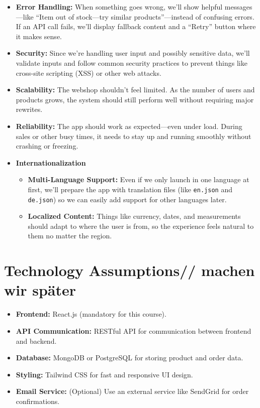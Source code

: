\documentclass[a4paper,12pt]{article}
\begin{document}
\begin{itemize}
    \item \textbf{Error Handling:}  
        When something goes wrong, we’ll show helpful messages—like “Item out of stock—try similar products”—instead of confusing errors. If an API call fails, we’ll display fallback content and a “Retry” button where it makes sense.
    
    \item \textbf{Security:}  
    Since we’re handling user input and possibly sensitive data, we’ll validate inputs and follow common security practices to prevent things like cross-site scripting (XSS) or other web attacks.

    \item \textbf{Scalability:}  
    The webshop shouldn’t feel limited. As the number of users and products grows, the system should still perform well without requiring major rewrites.

    \item \textbf{Reliability:}  
    The app should work as expected—even under load. During sales or other busy times, it needs to stay up and running smoothly without crashing or freezing.

    \item \textbf{Internationalization}
    \begin{itemize}
        \item \textbf{Multi-Language Support:}  
        Even if we only launch in one language at first, we’ll prepare the app with translation files (like \texttt{en.json} and \texttt{de.json}) so we can easily add support for other languages later.

        \item \textbf{Localized Content:}  
        Things like currency, dates, and measurements should adapt to where the user is from, so the experience feels natural to them no matter the region.
    \end{itemize}
\end{itemize}
	
	\section{Technology Assumptions// machen wir später}
	\begin{itemize}
		\item \textbf{Frontend:} React.js (mandatory for this course).
	
		\item \textbf{API Communication:} RESTful API for communication between frontend and backend.
		\item \textbf{Database:} MongoDB or PostgreSQL for storing product and order data.
		\item \textbf{Styling:} Tailwind CSS for fast and responsive UI design.
		\item \textbf{Email Service:} (Optional) Use an external service like SendGrid for order confirmations.
	\end{itemize}
	
\end{document}
